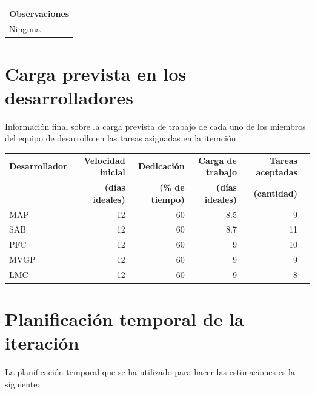 \documentclass[11pt]{article}
\begin{document}
\vspace{-0.8cm}
\begin{longtable}{p{1.028\linewidth}}
  \textbf{Observaciones}\\
  \midrule
  Ninguna\\
  \bottomrule
\end{longtable}



\section{Carga prevista en los desarrolladores}

Información final sobre la carga prevista de trabajo de cada uno de los miembros del equipo de desarrollo en las tareas asignadas en la iteración.

\begin{table}[H]
  \centering

  \begin{adjustbox}{width=\textwidth}
    \begin{tabular}{lrrrrr}
      \toprule
      \textbf{Desarrollador} & \textbf{Velocidad inicial} & \textbf{Dedicación} & \textbf{Carga de trabajo} & \textbf{Tareas aceptadas} \\
      & \textbf{(días ideales)} & \textbf{(\% de tiempo)} & \textbf{(días ideales)} & \textbf{ (cantidad)}\\
      \midrule
      MAP & 12 & 60 & 8.5 & 9\\
      SAB & 12 & 60 & 8.7 & 11\\
      PFC & 12 & 60 & 9 & 10\\
      MVGP & 12 & 60 & 9 & 9\\
      LMC & 12 & 60 & 9 & 8\\
      \bottomrule
    \end{tabular}
  \end{adjustbox}
\end{table}

\section{Planificación temporal de la iteración}
La planificación temporal que se ha utilizado para hacer las estimaciones es la siguiente:
\end{document}
